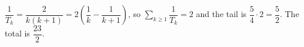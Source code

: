 $\dfrac1{T_k}=\dfrac2{k(k+1)}=2\left(\dfrac1k-\dfrac1{k+1}\right)$, so $\sum_{k\ge1}\dfrac1{T_k}=2$ and the tail is $\dfrac54\cdot2=\dfrac52$. The total is $\boxed{\dfrac{23}2}$.
